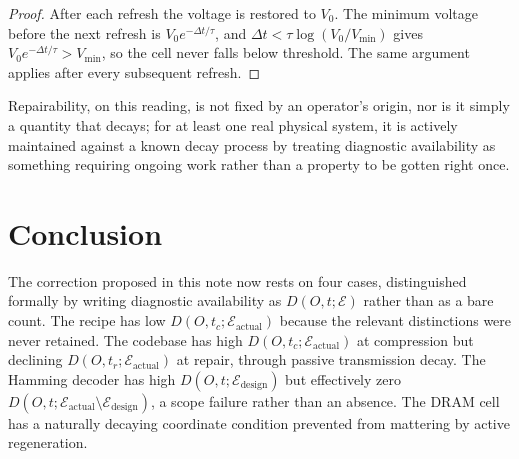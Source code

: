 \documentclass[11pt]{article}
\begin{document}
\begin{proof}
After each refresh the voltage is restored to $V_0$. The minimum voltage before the next refresh is $V_0 e^{-\Delta t/\tau}$, and $\Delta t < \tau \log(V_0/V_{\min})$ gives $V_0 e^{-\Delta t/\tau} > V_{\min}$, so the cell never falls below threshold. The same argument applies after every subsequent refresh.
\end{proof}

Repairability, on this reading, is not fixed by an operator's origin, nor is it simply a quantity that decays; for at least one real physical system, it is actively maintained against a known decay process by treating diagnostic availability as something requiring ongoing work rather than a property to be gotten right once.

\section{Conclusion}

The correction proposed in this note now rests on four cases, distinguished formally by writing diagnostic availability as $D(O,t;\mathcal{E})$ rather than as a bare count. The recipe has low $D(O,t_c;\mathcal{E}_{\text{actual}})$ because the relevant distinctions were never retained. The codebase has high $D(O,t_c;\mathcal{E}_{\text{actual}})$ at compression but declining $D(O,t_r;\mathcal{E}_{\text{actual}})$ at repair, through passive transmission decay. The Hamming decoder has high $D(O,t;\mathcal{E}_{\text{design}})$ but effectively zero $D(O,t;\mathcal{E}_{\text{actual}} \setminus \mathcal{E}_{\text{design}})$, a scope failure rather than an absence. The DRAM cell has a naturally decaying coordinate condition prevented from mattering by active regeneration.
\end{document}
